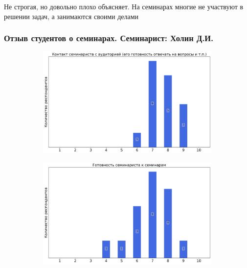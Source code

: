             \begin{commentbox} 
                Не строгая, но довольно плохо объясняет. На семинарах многие не участвуют в решении задач, а занимаются своими делами 
            \end{commentbox} 

	\subsubsection{Отзыв студентов о семинарах. Семинарист: Холин Д.И.}
		\begin{figure}[H]
			\centering
			\begin{subfigure}[b]{0.45\textwidth}
				\centering
				\includegraphics[width=\textwidth]{images/1 course/Общая физика - механика/seminarists-marks-Холин Д.И.-0.png}
			\end{subfigure}
			\begin{subfigure}[b]{0.45\textwidth}
				\centering
				\includegraphics[width=\textwidth]{images/1 course/Общая физика - механика/seminarists-marks-Холин Д.И.-1.png}

\end{subfigure}
\end{figure}
